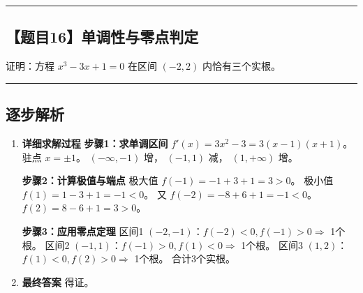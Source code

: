 \documentclass[UTF8]{ctexart}
\newenvironment{redenv}{\color{red}}{}
\newenvironment{detailedanalysis}{%
    \color{red}
    \begin{enumerate}[label=\textbf{第\arabic*步：}, leftmargin=*, align=left, itemsep=1.5ex]
}{%
    \end{enumerate}
}
\newcommand{\problemrule}{\noindent\rule{\textwidth}{1.5pt}\vspace{-0.8em}}
\newcommand{\analysisrule}{\noindent\rule{\textwidth}{0.8pt}\vspace{-0.8em}}
\begin{document}
\vspace{2em}
\problemrule
\subsection*{【题目16】单调性与零点判定}
证明：方程 $x^3 - 3x + 1 = 0$ 在区间 $(-2, 2)$ 内恰有三个实根。

\begin{redenv}
\analysisrule
\subsection*{逐步解析}

\begin{detailedanalysis}
\item \textbf{详细求解过程}
\noindent\textbf{步骤1：求单调区间}
$f'(x) = 3x^2 - 3 = 3(x-1)(x+1)$。
驻点 $x = \pm 1$。
$(-\infty, -1)$ 增， $(-1, 1)$ 减， $(1, +\infty)$ 增。

\noindent\textbf{步骤2：计算极值与端点}
极大值 $f(-1) = -1 + 3 + 1 = 3 > 0$。
极小值 $f(1) = 1 - 3 + 1 = -1 < 0$。
又 $f(-2) = -8 + 6 + 1 = -1 < 0$。
$f(2) = 8 - 6 + 1 = 3 > 0$。

\noindent\textbf{步骤3：应用零点定理}
区间1 $(-2, -1)$：$f(-2)<0, f(-1)>0 \Rightarrow$ 1个根。
区间2 $(-1, 1)$：$f(-1)>0, f(1)<0 \Rightarrow$ 1个根。
区间3 $(1, 2)$：$f(1)<0, f(2)>0 \Rightarrow$ 1个根。
合计3个实根。

\item \textbf{最终答案}
得证。
\end{detailedanalysis}
\end{redenv}
\end{document}

